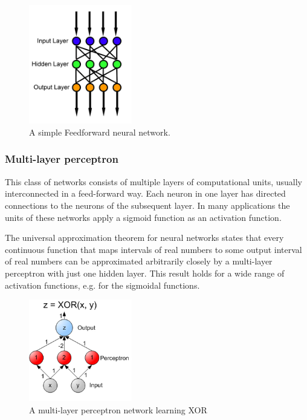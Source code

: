 \documentclass[14pt,a4paper]{extarticle}
\begin{document}
		\begin{figure}[H]
			\includegraphics[width=0.4\textwidth, center]{Feed_forward_neural_net.png}
			\caption{A simple Feedforward neural network.}
		\end{figure}
		
		
		\subsubsection{Multi-layer perceptron}
		This class of networks consists of multiple layers of computational units, usually interconnected in a feed-forward way. Each neuron in one layer has directed connections to the neurons of the subsequent layer. In many applications the units of these networks apply a sigmoid function as an activation function.

The universal approximation theorem for neural networks states that every continuous function that maps intervals of real numbers to some output interval of real numbers can be approximated arbitrarily closely by a multi-layer perceptron with just one hidden layer. This result holds for a wide range of activation functions, e.g. for the sigmoidal functions.

		\begin{figure}[H]
			\includegraphics[width=0.4\textwidth, center]{XOR_perceptron_net.png}
			\caption{A multi-layer perceptron network learning XOR}
		\end{figure}
		
\end{document}

